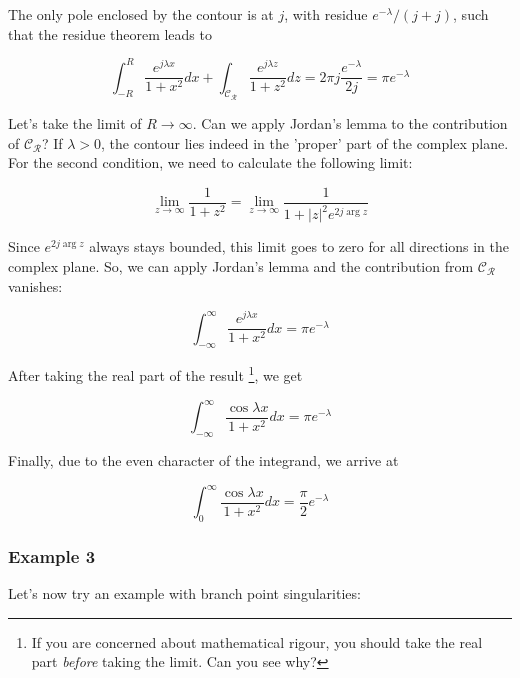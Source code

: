 The only pole enclosed by the contour is at $j$, with residue $e^{-\lambda}/(j
+j)$, such that the residue theorem leads to

\begin{equation}
\int_{-R}^{R} \frac{e^{j \lambda x}}{1 + x^2} dx + \int_{\mathcal{C_R}}
\frac{e^{j \lambda z}}{1 + z^2} dz = 2 \pi j \frac{e^{-\lambda}}{2 j} = \pi
e^{-\lambda}
\end{equation}

Let's take the limit of $R \to \infty$. Can we apply Jordan's lemma to the
contribution of $\mathcal{C_R}$? If $\lambda > 0$, the contour lies indeed in
the 'proper' part of the complex plane. For the second condition, we need to
calculate the following limit:

\begin{equation}
\lim_{z \to \infty}\frac{1}{1+z^2} = \lim_{z \to \infty}\frac{1}{1+|z|^2 e^{2 j
\arg z}}
\end{equation}

Since $e^{2 j \arg z}$ always stays bounded, this limit goes to zero for all
directions in the complex plane. So, we can apply Jordan's lemma and the
contribution from $\mathcal{C_R}$ vanishes:

\begin{equation}
\int_{-\infty}^{\infty}\frac{e^{j \lambda x}}{1 + x^2} dx = \pi e^{-\lambda}
\end{equation}

After taking the real part of the result \footnote{If you are concerned about mathematical rigour, you should take the real part \emph{before} taking the limit. Can you see why?}, we get

\begin{equation}
\int_{-\infty}^{\infty}\frac{\cos \lambda x}{1 + x^2} dx = \pi e^{-\lambda}
\end{equation}

Finally, due to the even character of the integrand, we arrive at

\begin{equation}
\int_0^{\infty}\frac{\cos \lambda x}{1 + x^2} dx = \frac{\pi}{2} e^{-\lambda}
\end{equation}

\subsubsection{Example 3}

Let's now try an example with branch point singularities:

